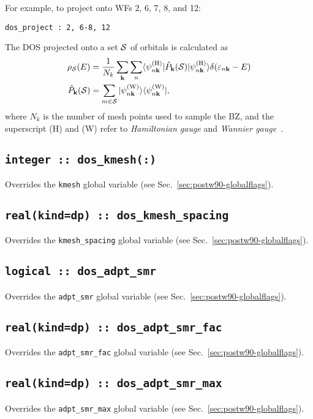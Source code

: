 For example, to project onto WFs 2, 6, 7, 8, and 12:

{\tt dos\_project : 2, 6-8, 12}

The DOS projected onto a set ${\cal S}$ of orbitals is calculated as
%
\begin{align}
\rho_{\cal S}(E)&=\frac{1}{N_k}\sum_{\bf k}\sum_n
\langle \psi_{n\bf k}^{({\rm H})}\vert \hat{P}_{\bf k}({\cal S})\vert 
\psi_{n\bf k}^{({\rm H})}\rangle\delta(\varepsilon_{n\bf k}-E)\\
\hat{P}_{\bf k}({\cal S})&=\sum_{m\in{\cal S}}
\vert \psi_{n\bf k}^{({\rm W})}\rangle\langle \psi_{n\bf k}^{({\rm W})}\vert,
\end{align}
%
where $N_k$ is the number of mesh points used to sample the BZ, and
the superscript (H) and (W) refer to {\it Hamiltonian gauge} and {\it
  Wannier gauge}~\cite{wang-prb06}.

\subsection[dos\_kmesh]{\tt integer :: dos\_kmesh(:)}
Overrides the \verb#kmesh# global variable (see Sec.~\ref{sec:postw90-globalflags}).

\subsection[dos\_kmesh\_spacing]{\tt real(kind=dp) :: dos\_kmesh\_spacing}
Overrides the \verb#kmesh_spacing# global variable (see Sec.~\ref{sec:postw90-globalflags}).

\subsection[dos\_adpt\_smr]{\tt logical :: dos\_adpt\_smr}
Overrides the \verb#adpt_smr# global variable (see Sec.~\ref{sec:postw90-globalflags}).

\subsection[dos\_adpt\_smr\_fac]{\tt real(kind=dp) :: dos\_adpt\_smr\_fac}
Overrides the \verb#adpt_smr_fac# global variable (see
Sec.~\ref{sec:postw90-globalflags}).

\subsection[dos\_adpt\_smr\_max]{\tt real(kind=dp) ::
  dos\_adpt\_smr\_max}
Overrides the \verb#adpt_smr_max# global variable (see
Sec.~\ref{sec:postw90-globalflags}).

